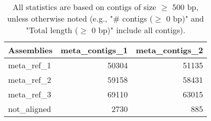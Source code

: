 \documentclass[12pt,a4paper]{article}
\begin{document}
\begin{table}[ht]
\begin{center}
\caption{All statistics are based on contigs of size $\geq$ 500 bp, unless otherwise noted (e.g., "\# contigs ($\geq$ 0 bp)" and "Total length ($\geq$ 0 bp)" include all contigs).}
\begin{tabular}{|l*{2}{|r}|}
\hline
Assemblies & meta\_contigs\_1 & meta\_contigs\_2 \\ \hline
meta\_ref\_1 & 50304 & 51135 \\ \hline
meta\_ref\_2 & 59158 & 58431 \\ \hline
meta\_ref\_3 & 69110 & 63015 \\ \hline
not\_aligned & 2730 & 885 \\ \hline
\end{tabular}
\end{center}
\end{table}
\end{document}
